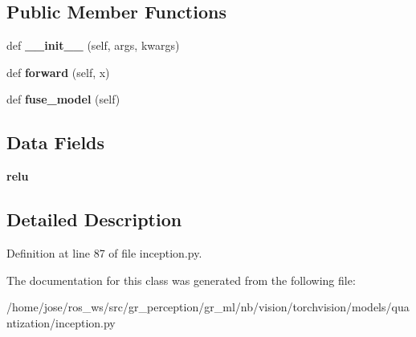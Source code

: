 \subsection*{Public Member Functions}
\begin{DoxyCompactItemize}
\item 
\mbox{\label{classtorchvision_1_1models_1_1quantization_1_1inception_1_1QuantizableBasicConv2d_a0b5b37508f94d9df733c5224d0f82bd9}} 
def {\bfseries \+\_\+\+\_\+init\+\_\+\+\_\+} (self, args, kwargs)
\item 
\mbox{\label{classtorchvision_1_1models_1_1quantization_1_1inception_1_1QuantizableBasicConv2d_a6edec7daa479d3d6f86a987a1320bb31}} 
def {\bfseries forward} (self, x)
\item 
\mbox{\label{classtorchvision_1_1models_1_1quantization_1_1inception_1_1QuantizableBasicConv2d_aac9b028d0baef26fbb651f81758347db}} 
def {\bfseries fuse\+\_\+model} (self)
\end{DoxyCompactItemize}
\subsection*{Data Fields}
\begin{DoxyCompactItemize}
\item 
\mbox{\label{classtorchvision_1_1models_1_1quantization_1_1inception_1_1QuantizableBasicConv2d_a49cdef8c815e9b4c346c465b4deb22bd}} 
{\bfseries relu}
\end{DoxyCompactItemize}


\subsection{Detailed Description}


Definition at line 87 of file inception.\+py.



The documentation for this class was generated from the following file\+:\begin{DoxyCompactItemize}
\item 
/home/jose/ros\+\_\+ws/src/gr\+\_\+perception/gr\+\_\+ml/nb/vision/torchvision/models/quantization/inception.\+py\end{DoxyCompactItemize}
